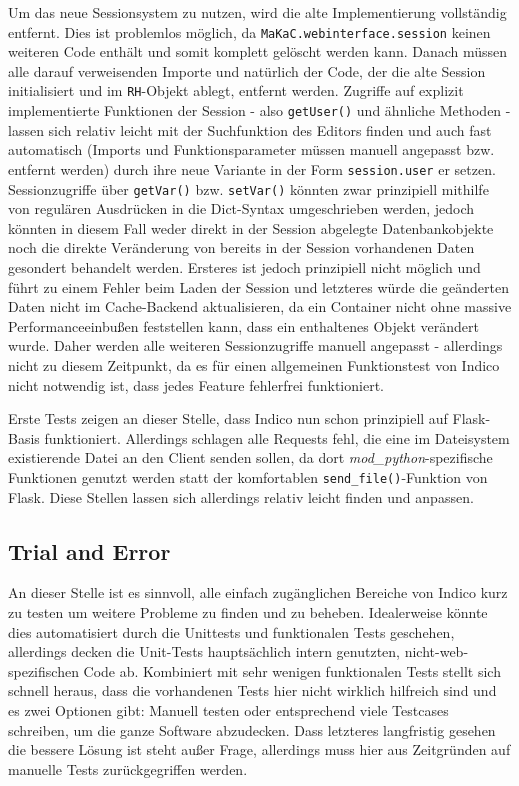 Um das neue Sessionsystem zu nutzen, wird die alte Implementierung vollständig entfernt. Dies ist
problemlos möglich, da \lstinline{MaKaC.webinterface.session} keinen weiteren Code enthält und somit
komplett gelöscht werden kann. Danach müssen alle darauf verweisenden Importe und natürlich der
Code, der die alte Session initialisiert und im \lstinline{RH}-Objekt ablegt, entfernt werden.
Zugriffe auf explizit implementierte Funktionen der Session - also \lstinline{getUser()} und
ähnliche Methoden - lassen sich relativ leicht mit der Suchfunktion des Editors finden und auch fast
automatisch (Imports und Funktionsparameter müssen manuell angepasst bzw. entfernt werden) durch
ihre neue Variante in der Form \lstinline{session.user} er setzen. Sessionzugriffe über
\lstinline{getVar()} bzw. \lstinline{setVar()} könnten zwar prinzipiell mithilfe von regulären
Ausdrücken in die Dict-Syntax umgeschrieben werden, jedoch könnten in diesem Fall weder direkt in
der Session abgelegte Datenbankobjekte noch die direkte Veränderung von bereits in der Session
vorhandenen Daten gesondert behandelt werden. Ersteres ist jedoch prinzipiell nicht möglich und
führt zu einem Fehler beim Laden der Session und letzteres würde die geänderten Daten nicht im
Cache-Backend aktualisieren, da ein Container nicht ohne massive Performanceeinbußen feststellen
kann, dass ein enthaltenes Objekt verändert wurde. Daher werden alle weiteren Sessionzugriffe
manuell angepasst - allerdings nicht zu diesem Zeitpunkt, da es für einen allgemeinen Funktionstest
von Indico nicht notwendig ist, dass jedes Feature fehlerfrei funktioniert.

Erste Tests zeigen an dieser Stelle, dass Indico nun schon prinzipiell auf Flask-Basis funktioniert.
Allerdings schlagen alle Requests fehl, die eine im Dateisystem existierende Datei an den Client
senden sollen, da dort \emph{mod\_python}-spezifische Funktionen genutzt werden statt der
komfortablen \lstinline{send_file()}-Funktion von Flask. Diese Stellen lassen sich allerdings
relativ leicht finden und anpassen.


\subsection{Trial and Error}
An dieser Stelle ist es sinnvoll, alle einfach zugänglichen Bereiche von Indico kurz zu testen um
weitere Probleme zu finden und zu beheben. Idealerweise könnte dies automatisiert durch die
Unittests und funktionalen Tests geschehen, allerdings decken die Unit-Tests hauptsächlich intern
genutzten, nicht-web-spezifischen Code ab. Kombiniert mit sehr wenigen funktionalen Tests stellt
sich schnell heraus, dass die vorhandenen Tests hier nicht wirklich hilfreich sind und es zwei
Optionen gibt: Manuell testen oder entsprechend viele Testcases schreiben, um die ganze Software
abzudecken. Dass letzteres langfristig gesehen die bessere Lösung ist steht außer Frage, allerdings
muss hier aus Zeitgründen auf manuelle Tests zurückgegriffen werden.

